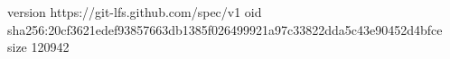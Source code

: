 version https://git-lfs.github.com/spec/v1
oid sha256:20cf3621edef93857663db1385f026499921a97c33822dda5c43e90452d4bfce
size 120942
